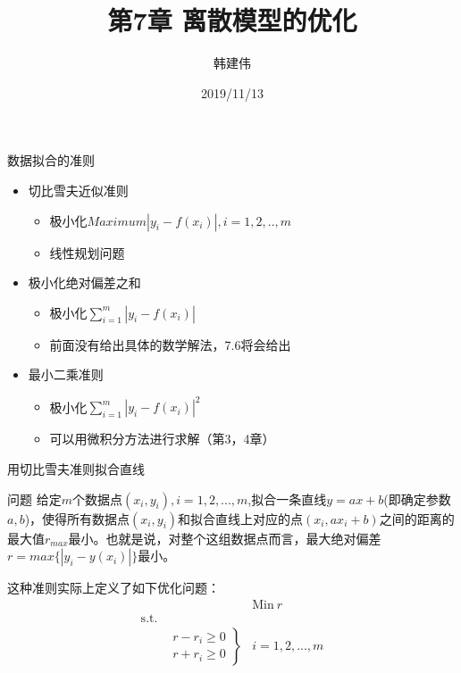 \documentclass[UTF8]{ctexbeamer}
\title{第7章 离散模型的优化}
\author{韩建伟}
\institute{
  信息学院\\
  \texttt{hanjianwei@zjgsu.edu.cn}
}
\date{2019/11/13}
\begin{document}
\begin{frame}[plain]
  \titlepage{}
\end{frame}

\begin{frame}{数据拟合的准则}

  \begin{itemize}
  \item 切比雪夫近似准则
    \begin{itemize}
    \item 极小化$Maximum |y_i - f(x_i)|,  i = 1, 2, .., m$
    \item 线性规划问题
    \end{itemize}
  \item 极小化绝对偏差之和 
    \begin{itemize}
    \item 极小化$\sum_{i=1}^m |y_i - f(x_i)|$
    \item 前面没有给出具体的数学解法，7.6将会给出
    \end{itemize}
  \item 最小二乘准则 
    \begin{itemize}
    \item 极小化$\sum_{i=1}^m |y_i - f(x_i)|^2$
    \item 可以用微积分方法进行求解（第3，4章）
    \end{itemize}
  \end{itemize}
  
\end{frame}

\begin{frame}{用切比雪夫准则拟合直线}
  \begin{block}{问题}
    给定$m$个数据点$(x_i, y_i), i=1, 2, ..., m$,拟合一条直线$y=ax+b$(即确定参数$a, b$)，使得所有数据点$(x_i, y_i)$和拟合直线上对应的点$(x_i, ax_i+b)$之间的距离的最大值$r_{max}$最小。也就是说，对整个这组数据点而言，最大绝对偏差$r=max\{|y_i-y(x_i)|\}$最小。
  \end{block}

  这种准则实际上定义了如下优化问题：
  \[ 
  \begin{array}{lcl}
    & & \mbox{Min}\ r \\
    \mbox{s.t.} & &  \\
    &
    \left.
      \begin{array}{c}
        r-r_i \ge 0\\
        r+r_i \ge 0
      \end{array}
    \right\}& i = 1, 2, ... , m
  \end{array}
  \]
\end{frame}
\end{document}

